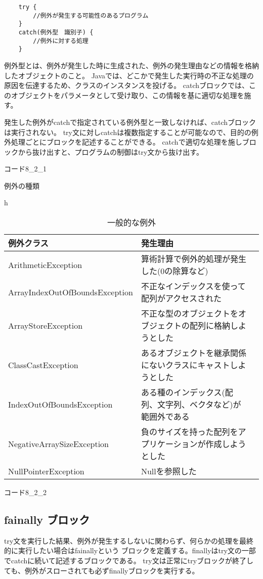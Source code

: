 \documentclass[12pt,a4j,twoside]{jsbook}
\begin{document}
\begin{lstlisting}
    try {
        //例外が発生する可能性のあるプログラム
    }　
    catch(例外型　識別子) {
        //例外に対する処理
    }
\end{lstlisting}
例外型とは、例外が発生した時に生成された、例外の発生理由などの情報を格納したオブジェクトのこと。
Javaでは、どこかで発生した実行時の不正な処理の原因を伝達するため、クラスのインスタンスを投げる。
catchブロックでは、このオブジェクトをパラメータとして受け取り、この情報を基に適切な処理を施す。

発生した例外がcatchで指定されている例外型と一致しなければ、catchブロックは実行されない。
try文に対しcatchは複数指定することが可能なので、目的の例外処理ごとにブロックを記述することができる。
catchで適切な処理を施しブロックから抜け出すと、プログラムの制御はtry文から抜け出す。

コード8\_2\_1

例外の種類

\begin{table}{h}
    \caption{一般的な例外}
    \begin{tabular}{|l|l|l|} \hline
        例外クラス & 発生理由 \\ \hline
        ArithmeticException & 算術計算で例外的処理が発生した(0の除算など)　\\ \hline
        ArrayIndexOutOfBoundsException & 不正なインデックスを使って配列がアクセスされた　 \\ \hline
        ArrayStoreException & 不正な型のオブジェクトをオブジェクトの配列に格納しようとした \\ \hline
        ClassCastException & あるオブジェクトを継承関係にないクラスにキャストしようとした \\ \hline
        IndexOutOfBoundsException & ある種のインデックス(配列、文字列、ベクタなど)が範囲外である \\ \hline
        NegativeArraySizeException & 負のサイズを持った配列をアプリケーションが作成しようとした \\ \hline
        NullPointerException & Nullを参照した \\ \hline
    \end{tabular}
\end{table}

コード8\_2\_2

\subsection{fainally ブロック}
try文を実行した結果、例外が発生するしないに関わらず、何らかの処理を最終的に実行したい場合はfainallyという
ブロックを定義する。finallyはtry文の一部でcatchに続いて記述するブロックである。
try文は正常にtryブロックが終了しても、例外がスローされても必ずfinallyブロックを実行する。
\end{document}

